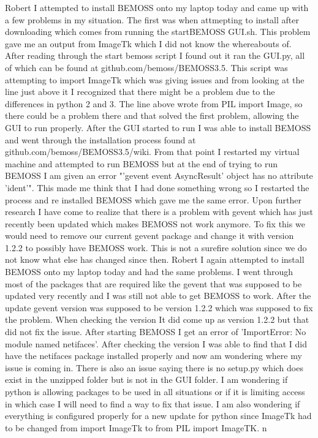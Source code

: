 \documentclass[fontsize=11pt, %
                             paper=letter, %
                             twoside, %
                             captions=tableheading,
                             index=totoc,
                             hyperref]{labbook}
\begin{document}
Robert \newline
I attempted to install BEMOSS onto my laptop today and came up with a few problems in my situation. The first was when attmepting to install after downloading which comes from running the startBEMOSS GUI.sh. This problem gave me an output from ImageTk which I did not know the whereabouts of. After reading through the start bemoss script I found out it ran the GUI.py, all of which can be found at github.com/bemoss/BEMOSS3.5. This script was attempting to import ImageTk which was giving issues and from looking at the line just above it I recognized that there might be a problem due to the differences in python 2 and 3. The line above wrote from PIL import Image, so there could be a problem there and that solved the first problem, allowing the GUI to run properly. After the GUI started to run I was able to install BEMOSS and went through the installation process found at github.com/bemoss/BEMOSS3.5/wiki. From that point I restarted my virtual machine and attempted to run BEMOSS but at the end of trying to run BEMOSS I am given an error "'gevent event AsyncResult' object has no attribute 'ident'". This made me think that I had done something wrong so I restarted the process and re installed BEMOSS which gave me the same error. Upon further research I have come to realize that there is a problem with gevent which has just recently been updated which makes BEMOSS not work anymore. To fix this we would need to remove our current gevent package and change it with version 1.2.2 to possibly have BEMOSS work. This is not a surefire solution since we do not know what else has changed since then.
Robert \newline
I again attempted to install BEMOSS onto my laptop today and had the same problems. I went through most of the packages that are required like the gevent that was supposed to be updated very recently and I was still not able to get BEMOSS to work. After the update gevent version was supposed to be version 1.2.2 which was supposed to fix the problem. When checking the version It did come up as version 1.2.2 but that did not fix the issue. After starting BEMOSS I get an error of 'ImportError: No module named netifaces'. After checking the version I was able to find that I did have the netifaces package installed properly and now am wondering where my issue is coming in. There is also an issue saying there is no setup.py which does exist in the unzipped folder but is not in the GUI folder. I am wondering if python is allowing packages to be used in all situations or if it is limiting access in which case I will need to find a way to fix that issue. I am also wondering if everything is configured properly for a new update for python since ImageTk had to be changed from import ImageTk to from PIL import ImageTK. n
\end{document}
